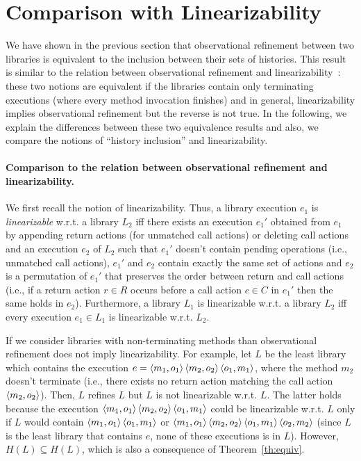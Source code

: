\section{Comparison with Linearizability}
\label{sec:lin}


We have shown in the previous section that observational refinement between two libraries is 
equivalent to the inclusion between their sets of histories. This result is
similar to the relation between observational refinement and 
linearizability~\cite{journals/tcs/FilipovicORY10}: these two notions are equivalent if the libraries
contain only terminating executions (where every method invocation finishes) and in general,
linearizability implies observational refinement but the reverse is not true.
In the following, we explain the differences between these two equivalence results and also, we compare
the notions of ``history inclusion'' and linearizability.

\paragraph{Comparison to the relation between observational refinement and linearizability.}
We first recall the notion of
linearizability. Thus, a library execution $e_1$ is \emph{linearizable} w.r.t. a
library $L_2$ iff there exists an execution $e_1'$ obtained from $e_1$ by
appending return actions (for unmatched call actions) or deleting call actions
and an execution $e_2$ of $L_2$ such that $e_1'$ doesn't contain pending operations 
(i.e., unmatched call actions), $e_1'$ and $e_2$ contain exactly the same set of actions and $e_2$
is a permutation of $e_1'$ that preserves the order between return and call
actions (i.e., if a return action $r\in R$ occurs before a call action $c\in C$
in $e_1'$ then the same holds in $e_2$). Furthermore, a library $L_1$ is linearizable
w.r.t. a library $L_2$ iff every execution $e_1\in L_1$ is linearizable w.r.t.
$L_2$. %

If we consider libraries with non-terminating methods than observational refinement does not
imply linearizability. For example, let $L$ be the least library which contains the execution 
$e=\left\langle {m_1,o_1} \right\rangle\left\langle {m_2,o_2} \right\rangle\left\langle {o_1,m_1} \right\rangle$, where the method $m_2$ doesn't terminate 
(i.e., there exists no return action matching the call action $\left\langle {m_2,o_2} \right\rangle$). Then, $L$ refines $L$
but $L$ is not linearizable w.r.t. $L$. The latter holds because the execution 
$\left\langle {m_1,o_1} \right\rangle\left\langle {m_2,o_2} \right\rangle\left\langle {o_1,m_1} \right\rangle$ could be linearizable w.r.t. $L$ only if $L$ would contain
$\left\langle {m_1,o_1} \right\rangle\left\langle {o_1,m_1} \right\rangle$ or $\left\langle {m_1,o_1} \right\rangle\left\langle {m_2,o_2} \right\rangle\left\langle {o_1,m_1} \right\rangle\left\langle {o_2,m_2} \right\rangle$
(since $L$ is the least library that contains $e$, none of these executions is in $L$).
However, $H(L)\subseteq H(L)$, which is also a consequence of Theorem~\ref{th:equiv}.

